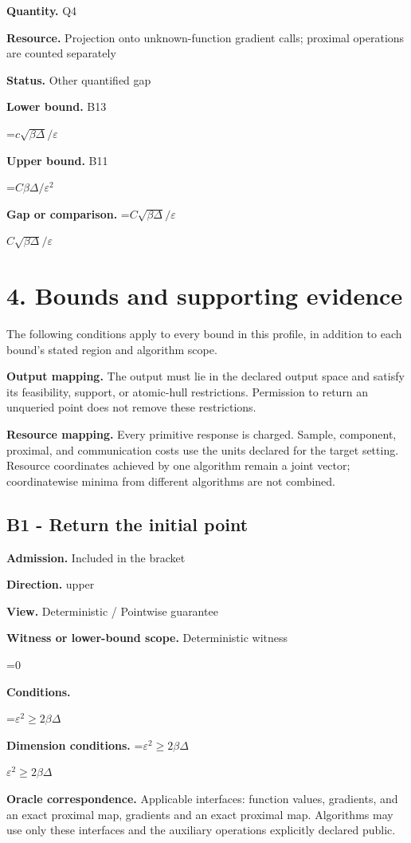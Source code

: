 \documentclass[10pt,a4paper]{article}
\newcommand{\AtlasMath}[1]{\par\begingroup\centering\setbox0=\hbox{$\displaystyle #1$}\ifdim\wd0>1.4\linewidth\typeout{ATLAS WIDE FORMULA: \the\wd0}\fi\ifdim\wd0>\linewidth\resizebox{\linewidth}{!}{\box0}\else\box0\fi\par\endgroup}
\newcommand{\AtlasInlineMath}[1]{\begingroup\setbox0=\hbox{$#1$}\ifdim\wd0>.4\linewidth\endgroup\AtlasMath{#1}\else\endgroup$#1$\fi}
\begin{document}
\textbf{Quantity.} Q4

\textbf{Resource.} Projection onto unknown-function gradient calls; proximal operations are counted separately

\textbf{Status.} Other quantified gap

\textbf{Lower bound.} B13

\AtlasMath{c\sqrt{\beta\Delta}/\varepsilon}
\textbf{Upper bound.} B11

\AtlasMath{C\beta\Delta/\varepsilon^2}
\textbf{Gap or comparison.} \AtlasInlineMath{C\sqrt{\beta\Delta}/\varepsilon}

\section{4. Bounds and supporting evidence}
The following conditions apply to every bound in this profile, in addition to each bound's stated region and algorithm scope.

\textbf{Output mapping.} The output must lie in the declared output space and satisfy its feasibility, support, or atomic-hull restrictions. Permission to return an unqueried point does not remove these restrictions.

\textbf{Resource mapping.} Every primitive response is charged. Sample, component, proximal, and communication costs use the units declared for the target setting. Resource coordinates achieved by one algorithm remain a joint vector; coordinatewise minima from different algorithms are not combined.

\subsection{B1 - Return the initial point}
\textbf{Admission.} Included in the bracket

\textbf{Direction.} upper

\textbf{View.} Deterministic / Pointwise guarantee

\textbf{Witness or lower-bound scope.} Deterministic witness

\AtlasMath{0}
\textbf{Conditions.} 
\AtlasMath{\varepsilon^2\ge2\beta\Delta}


\textbf{Dimension conditions.} \AtlasInlineMath{\varepsilon^2\ge2\beta\Delta}

\textbf{Oracle correspondence.} Applicable interfaces: function values, gradients, and an exact proximal map, gradients and an exact proximal map. Algorithms may use only these interfaces and the auxiliary operations explicitly declared public.
\end{document}
